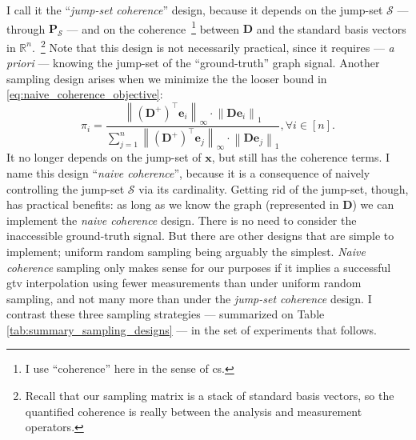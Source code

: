 I call it the ``\emph{jump-set coherence}'' design, because it depends on the jump-set $\mathcal{S}$ --- through $\mathbf{P}_{\mathcal{S}}$ --- and on the coherence~\footnote{I use ``coherence'' here in the sense of \acrlong{cs}.} between $\mathbf{D}$ and the standard basis vectors in $\mathbb{R}^{n}$.~\footnote{Recall that our sampling matrix is a stack of standard basis vectors, so the quantified coherence is really between the analysis and measurement operators.} Note that this design is not necessarily practical, since it requires --- \emph{a priori} --- knowing the jump-set of the ``ground-truth'' graph signal. Another sampling design arises when we minimize the the looser bound in \eqref{eq:naive_coherence_objective}:
\begin{equation}
    \pi_i = \frac{\left \| (\mathbf{D}^{+})^{\top} \mathbf{e}_{i} \right \|_{\infty} \cdot \left \| \mathbf{D} \mathbf{e}_{i} \right \|_{1}}{\sum_{j=1}^{n} \left \| (\mathbf{D}^{+})^{\top} \mathbf{e}_{j} \right \|_{\infty} \cdot \left \| \mathbf{D} \mathbf{e}_{j} \right \|_{1}}, \forall i \in [n].
    \label{eq:naive_coherence_probabilities}
\end{equation}
It no longer depends on the jump-set of $\mathbf{x}$, but still has the coherence terms. I name this design ``\emph{naive coherence}'', because it is a consequence of naively controlling the jump-set $\mathcal{S}$ via its cardinality. Getting rid of the jump-set, though, has practical benefits: as long as we know the graph (represented in $\mathbf{D}$) we can implement the \emph{naive coherence} design. There is no need to consider the inaccessible ground-truth signal. But there are other designs that are simple to implement; uniform random sampling being arguably the simplest. \emph{Naive coherence} sampling only makes sense for our purposes if it implies a successful \acrshort{gtv} interpolation using fewer measurements than under uniform random sampling, and not many more than under the \emph{jump-set coherence} design. I contrast these three sampling strategies --- summarized on Table \ref{tab:summary_sampling_designs} --- in the set of experiments that follows.

